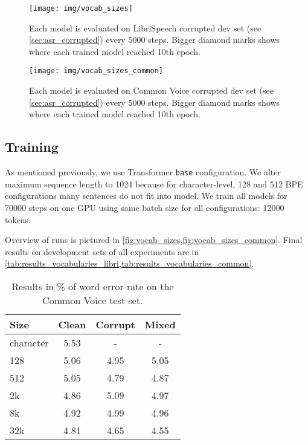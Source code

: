 	\begin{figure}[p]
		\texttt{[image: img/vocab\_sizes]}
		\caption{Each model is evaluated on LibriSpeech corrupted dev set (see \cref{sec:asr_corrupted}) every 5000 steps. Bigger diamond marks shows where each trained model reached 10th epoch.}
		\label{fig:vocab_sizes}
	\end{figure}

	\begin{figure}[p]
		\texttt{[image: img/vocab\_sizes\_common]}
		\caption{Each model is evaluated on Common Voice corrupted dev set (see \cref{sec:asr_corrupted}) every 5000 steps. Bigger diamond marks shows where each trained model reached 10th epoch.}
		\label{fig:vocab_sizes_common}
	\end{figure}


\subsection{Training}

As mentioned previously, we use Transformer \texttt{base} configuration. We alter maximum sequence length to 1024 because for character-level, 128 and 512 BPE configurations many sentences do not fit into model. We train all models for 70000 steps on one GPU using same batch size for all configurations: 12000 tokens. 

Overview of runs is pictured in \cref{fig:vocab_sizes,fig:vocab_sizes_common}. Final results on development sets of all experiments are in \cref{tab:results_vocabularies_libri,tab:results_vocabularies_common}.


\begin{table}[p]
	\centering
	\begin{tabular}{l|ccc}
		\bf Size & \bf Clean & \bf Corrupt & \bf Mixed \\
		\hline
		character	&	5.53	&	-	&	- \\
		128	&	5.06	&	4.95	&	5.05 \\
		512	&	5.05	&	4.79	&	4.87 \\
		2k	&	4.86	&	5.09	&	4.97 \\
		8k	&	4.92	&	4.99	&	4.96 \\
		32k	&	4.81	&	4.65	&	4.55 \\
		
	\end{tabular}
	
	\caption{Results in \% of word error rate on the Common Voice test set.}
	\label{tab:results_vocabularies_common_test}
\end{table}


